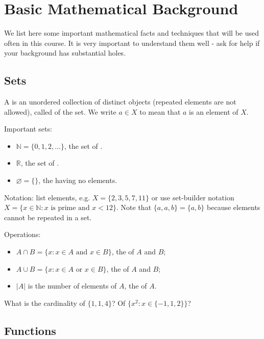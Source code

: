 \setcounter{chapter}{-1}
\chapter{Basic Mathematical Background}
\label{ch:app:mathtools}

We list here some important mathematical facts and techniques  that will be used often in this course. It is very important to understand them well - ask for help if your background has substantial holes.

\section{Sets}

A  is an unordered collection of distinct objects (repeated elements are not allowed), called  of the set. We write $a\in X$ to mean that $a$ is an element of $X$.

Important sets: 
\begin{itemize}
\item $\mathbb{N} = \{0,1,2,\dots \}$, the set of .
\item $\mathbb{R}$, the set of .
\item $\varnothing = \{\}$, the  having no elements.
\end{itemize}

Notation: list elements, e.g. $X = \{2,3,5,7,11\}$ or use set-builder notation $X = \{x\in \mathbb{N} : \text{$x$ is prime and $x< 12$}\}$. Note that $\{a, a, b\} = \{a, b\}$ because elements cannot be repeated in a set.

Operations: 
\begin{itemize}
\item $A\cap B = \{x: x\in A \text{ and } x\in B\}$, the  of $A$ and $B$;
\item $A\cup B = \{x: x\in A \text{ or  } x\in B\}$, the  of $A$ and $B$;
\item $|A|$ is the number of elements of $A$, the  of $A$.
\end{itemize}

\begin{Boxample}[4]
What is the cardinality of $\{1,1,4\}$? Of $\{x^2 : x \in \{-1,1,2\}\}$?
\end{Boxample}

\section{Functions}

